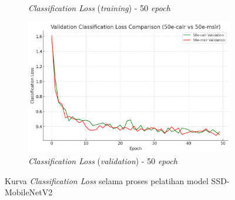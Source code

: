\begin{figure}[htbp]
\begin{subfigure}{0.45\textwidth}
    \caption{\emph{Classification Loss} (\emph{training}) - 50 \emph{epoch}}
  \end{subfigure}
  \hfill
  \begin{subfigure}{0.45\textwidth}
    \includegraphics[width=\textwidth]{gambar/bab4-val-clsloss-50e.png}
    \caption{\emph{Classification Loss} (\emph{validation}) - 50 \emph{epoch}}
  \end{subfigure}
  \caption{Kurva \emph{Classification Loss} selama proses pelatihan model SSD-MobileNetV2}
  \label{fig:classification_loss_curves}
\end{figure}

